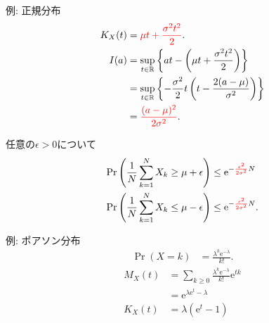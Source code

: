 \documentclass[lualatex,handout]{beamer}
\newcommand{\emm}[1]{\textcolor{red}{#1}}
\theoremstyle{definition}
\begin{document}
\begin{frame}{例: 正規分布}
\begin{align*}
K_X(t) &= \emm{\mu t + \frac{\sigma^2t^2}2}.\\
I(a)&=\sup_{t\in\mathbb{R}} \left\{at - \left(\mu t + \frac{\sigma^2t^2}2\right)\right\}\\
&= \sup_{t\in\mathbb{R}} \left\{-\frac{\sigma^2}2 t\left(t-\frac{2(a-\mu)}{\sigma^2}\right) \right\}\\
&=\emm{\frac{(a-\mu)^2}{2\sigma^2}}.
\end{align*}

\vspace{1em}
任意の$\epsilon>0$について
\begin{align*}
\Pr\left(\frac1N\sum_{k=1}^N X_k \ge \mu + \epsilon\right) &\le \mathrm{e}^{-\emm{\frac{\epsilon^2}{2\sigma^2}}N}\\
\Pr\left(\frac1N\sum_{k=1}^N X_k \le \mu - \epsilon\right) &\le \mathrm{e}^{-\emm{\frac{\epsilon^2}{2\sigma^2}}N}.
\end{align*}
\end{frame}

\begin{frame}{例: ポアソン分布}
\begin{align*}
\Pr(X=k) &= \frac{\lambda^k\mathrm{e}^{-\lambda}}{k!}.
\end{align*}
\begin{align*}
M_X(t) &= \sum_{k\ge 0}\frac{\lambda^k\mathrm{e}^{-\lambda}}{k!} \mathrm{e}^{tk}\\
&= \mathrm{e}^{\lambda\mathrm{e}^t - \lambda}\\
K_X(t) &= \lambda(\mathrm{e}^t-1)
\end{align*}
\end{frame}
\end{document}
